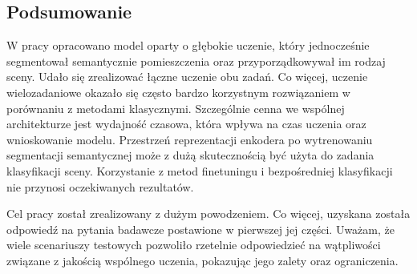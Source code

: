 \subsection{Podsumowanie}

W pracy opracowano model oparty o głębokie uczenie, który jednocześnie segmentował semantycznie pomieszczenia oraz przyporządkowywał im rodzaj sceny. Udało się zrealizować łączne uczenie obu zadań. Co więcej, uczenie wielozadaniowe okazało się często bardzo korzystnym rozwiązaniem w porównaniu z metodami klasycznymi. Szczególnie cenna we wspólnej architekturze jest wydajność czasowa, która wpływa na czas uczenia oraz wnioskowanie modelu. Przestrzeń reprezentacji enkodera po wytrenowaniu segmentacji semantycznej może z dużą skutecznością być użyta do zadania klasyfikacji sceny. Korzystanie z metod finetuningu i bezpośredniej klasyfikacji nie przynosi oczekiwanych rezultatów.

Cel pracy został zrealizowany z dużym powodzeniem. Co więcej, uzyskana została odpowiedź na pytania badawcze postawione w pierwszej jej części. Uważam, że wiele scenariuszy testowych pozwoliło rzetelnie odpowiedzieć na wątpliwości związane z jakością wspólnego uczenia, pokazując jego zalety oraz ograniczenia.










